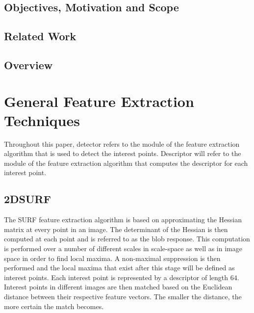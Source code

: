 \documentclass{report}
\begin{document}
\section{Objectives, Motivation and Scope}
\label{sec:objectives}



\section{Related Work}
\label{sec:relatedWork}

\section{Overview}
\label{sec:overview}



\chapter{General Feature Extraction Techniques}
\label{sec:genFeatureExtract}

Throughout this paper, detector refers to the module of the feature extraction algorithm that is used to detect the interest points. Descriptor will refer to the module of the feature extraction algorithm that computes the descriptor for each interest point.\\


\section{2DSURF}
\label{sec:2dsurf}
The SURF feature extraction algorithm is based on approximating the Hessian matrix at every point in an image. The determinant of the Hessian is then computed at each point and is referred to as the blob response. This computation is performed over a number of different scales in scale-space as well as in image space in order to find local maxima. A non-maximal suppression is then performed and the local maxima that exist after this stage will be defined as interest points. Each interest point is represented by a descriptor of length $64$. Interest points in different images are then matched based on the Euclidean distance between their respective feature vectors. The smaller the distance, the more certain the match becomes. 
\end{document}
